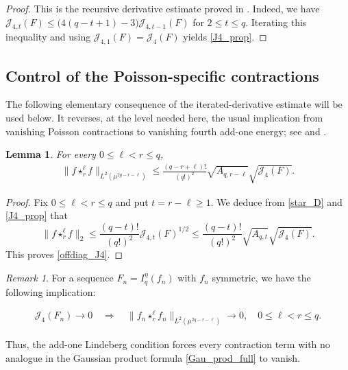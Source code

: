 \documentclass[letterpaper,11pt,reqno]{amsart}
\numberwithin{equation}{section}
\theoremstyle{plain}
\newtheorem{lemma}[theorem]{Lemma}
\theoremstyle{definition}
\theoremstyle{remark}
\newtheorem{remark}[theorem]{Remark}
\newcommand{\noi}{\noindent}
\newcommand{\Jfour}{\mathcal J_4}
\begin{document}
\begin{proof}
This is the recursive derivative estimate proved in
\cite[Proof of Theorem~1.8]{Zhe26a}.  Indeed,
we have
$ \mathcal J_{4,t}(F)
 \leq
 \bigl(4(q-t+1)-3\bigr)
 \mathcal J_{4,t-1}(F)$
 for $2\leq t\leq q$.
Iterating this inequality and using
$\mathcal J_{4,1}(F)=\Jfour(F)$ yields \eqref{J4_prop}.
\end{proof}

\subsection{Control of the Poisson-specific contractions}
\label{SEC_52}

The following elementary consequence of the iterated-derivative
estimate will be used below.  It reverses, at the level needed here, the
usual implication from vanishing Poisson contractions to vanishing
fourth add-one energy; see \cite[Remark~1.8(b)]{DP18b} and
\cite[Lemma~4.1]{PT13}.


\begin{lemma}
\label{lem_offdiag}
For every $0\leq\ell<r\leq q$,
\noi
\begin{align}
 \big\| f\star_r^\ell f \big\|_{L^2(\mu^{2q-r-\ell})}
 \leq
 \frac{(q-r+\ell)!}{(q!)^2}
 \sqrt{A_{q,r-\ell}}\sqrt{\Jfour(F)}.
 \label{offdiag_J4}
\end{align}
\end{lemma}

\begin{proof}
Fix $0\leq\ell<r\leq q$ and put $t=r-\ell\geq1$.  We deduce from
\eqref{star_D} and \eqref{J4_prop} that
\[
 \|f\star_r^\ell f\|_2
 \leq\frac{(q-t)!}{(q!)^2}\mathcal J_{4,t}(F)^{1/2}
 \leq\frac{(q-t)!}{(q!)^2}
 \sqrt{A_{q,t}}\sqrt{\Jfour(F)}.
\]
This proves \eqref{offdiag_J4}.
\end{proof}


\begin{remark}\rm
\label{rem_offdiag_vanish}
For a sequence $F_n=I_q^\eta(f_n)$ with $f_n$ symmetric,
we have the following implication:

\noi
\begin{align*}
 \Jfour(F_n)\longrightarrow0
 \quad\Longrightarrow\quad
 \big\|f_n\star_r^\ell f_n\big\|_{L^2(\mu^{2q-r-\ell})}
 \longrightarrow0,
 \quad 0\leq\ell<r\leq q.
\end{align*}

Thus, the add-one Lindeberg condition forces every contraction term with
no analogue in the Gaussian product formula \eqref{Gau_prod_full} to vanish.
\end{remark}
\end{document}

